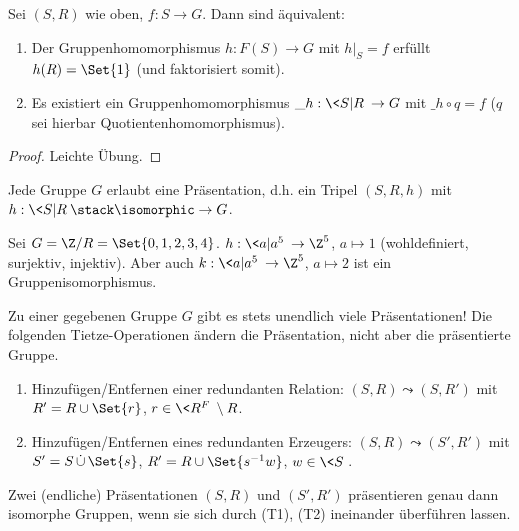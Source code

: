 \begin{st}
    Sei $(S,R)$ wie oben, $f : S \to G$.
    Dann sind äquivalent:
    \begin{enumerate}[1)]
        \item
            Der Gruppenhomomorphismus $h: F(S) \to G$ mit $h|_S = f$ erfüllt $h(R) = \Set{1}$ (und faktorisiert somit).
        \item
            Es existiert ein Gruppenhomomorphismus $\_h: \<S|R\> \to G$ mit $\_h \circ q = f$ ($q$ sei hierbar Quotientenhomomorphismus).
    \end{enumerate}
    \begin{proof}
        Leichte Übung.
    \end{proof}
\end{st}

\begin{prop}
    Jede Gruppe $G$ erlaubt eine Präsentation, d.h. ein Tripel $(S,R,h)$ mit $h: \<S | R\> \stack\isomorphic\to G$.
\end{prop}

\begin{ex}
    Sei $G = \Z / R = \Set{0,1,2,3,4}$.
    $h: \< a | a^5\> \to \Z^5$, $a \mapsto 1$ (wohldefiniert, surjektiv, injektiv).
    Aber auch $k: \<a|a^5\> \to \Z^5$, $a \mapsto 2$ ist ein Gruppenisomorphismus.
\end{ex}

Zu einer gegebenen Gruppe $G$ gibt es stets unendlich viele Präsentationen!
Die folgenden Tietze-Operationen ändern die Präsentation, nicht aber die präsentierte Gruppe.
\begin{enumerate}[(T1)]
    \item
        Hinzufügen/Entfernen einer redundanten Relation: $(S,R) \leadsto (S,R')$ mit $R' = R \cup \Set{r}$, $r \in \<R^F\> \setminus R$.
    \item
        Hinzufügen/Entfernen eines redundanten Erzeugers: $(S,R) \leadsto (S',R')$ mit $S' = S \dotcup \Set{s}$, $R' = R \cup \Set{s^{-1} w}$, $w \in \<S\>$.
\end{enumerate}

\begin{st}[Tietze, 1908]
    Zwei (endliche) Präsentationen $(S,R)$ und $(S',R')$ präsentieren genau dann isomorphe Gruppen, wenn sie sich durch (T1), (T2) ineinander überführen lassen.
\end{st}


